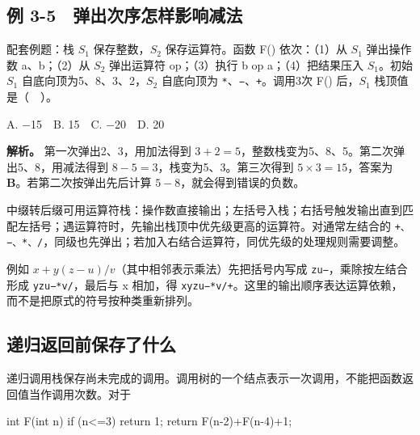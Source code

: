 \subsection{例 3-5　弹出次序怎样影响减法}\label{DS03-ex5}

\begin{example}[配套例题]

配套例题：栈 \(S_1\) 保存整数，\(S_2\) 保存运算符。函数 F() 依次：（1）从 \(S_1\) 弹出操作数 a、b；（2）从 \(S_2\) 弹出运算符 op；（3）执行 b op a；（4）把结果压入 \(S_1\)。初始 \(S_1\) 自底向顶为5、8、3、2，\(S_2\) 自底向顶为 \texttt{*\allowbreak{}}、\texttt{−}、\texttt{+\allowbreak{}}。调用3次 F() 后，\(S_1\) 栈顶值是（　）。

A. \ensuremath{-}15　B. 15　C. \ensuremath{-}20　D. 20

\end{example}

\textbf{解析。} 第一次弹出2、3，用加法得到 \(3+2=5\)，整数栈变为5、8、5。第二次弹出5、8，用减法得到 \(8-5=3\)，栈变为5、3。第三次得到 \(5\times3=15\)，答案为 \textbf{B}。若第二次按弹出先后计算 \(5-8\)，就会得到错误的负数。

中缀转后缀可用运算符栈：操作数直接输出；左括号入栈；右括号触发输出直到匹配左括号；遇运算符时，先输出栈顶中优先级更高的运算符。对通常左结合的 \texttt{+\allowbreak{}、−、*\allowbreak{}、/\allowbreak{}}，同级也先弹出；若加入右结合运算符，同优先级的处理规则需要调整。

例如 \(x+y(z-u)/v\)（其中相邻表示乘法）先把括号内写成 \texttt{zu−}，乘除按左结合形成 \texttt{yzu−*\allowbreak{}v/\allowbreak{}}，最后与 x 相加，得 \texttt{xyzu−*\allowbreak{}v/\allowbreak{}+\allowbreak{}}。这里的输出顺序表达运算依赖，而不是把原式的符号按种类重新排列。

\subsection{递归返回前保存了什么}\label{DS03-detail3}

递归调用栈保存尚未完成的调用。调用树的一个结点表示一次调用，不能把函数返回值当作调用次数。对于

\par\medskip\noindent\begin{minipage}{\linewidth}
\begin{codeblock}[language=C]
int F(int n) {
    if (n<=3) return 1;
    return F(n-2)+F(n-4)+1;
}
\end{codeblock}
\end{minipage}\par\medskip

